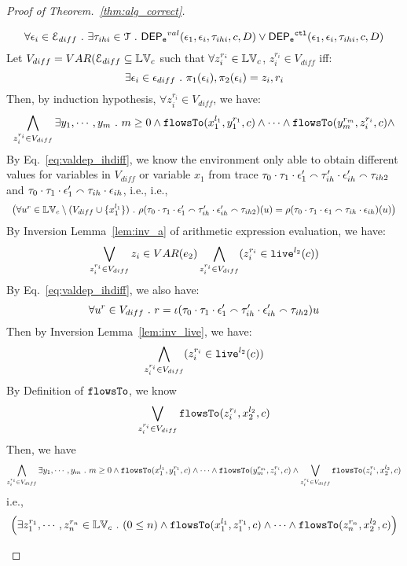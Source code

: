 \begin{proof}[Proof of Theorem.~\ref{thm:alg_correct}]
\begin{case}
\begin{subcase}
\[
  \forall \mathtt{\epsilon}_i \in \mathcal{E}_{diff} ~.~ \exists \mathtt{\tau}_{ihi} \in \mathcal{T} ~.~
  \mathsf{DEP_{\mathtt{e}}}^{val}(\mathtt{\epsilon}_1, \mathtt{\epsilon}_i, \mathtt{\tau}_{ihi}, c, D) 
  \lor \mathsf{DEP_{\mathtt{e}}}^{\mathtt{{ctl}}}(\mathtt{\epsilon}_1, \mathtt{\epsilon}_i, \mathtt{\tau}_{ihi}, c, D)
\]
Let $V_{diff} = VAR(\mathcal{E}_{diff} \subseteq \mathbb{LV}_c$ such that $\forall z_i^{r_i} \in \mathbb{LV}_c$, $z_i^{r_i} \in V_{diff}$ iff:
\[
  \exists \mathtt{\epsilon}_i \in \mathtt{\epsilon}_{diff} ~.~ \pi_1(\mathtt{\epsilon}_i), \pi_2(\mathtt{\epsilon}_i) = z_i, r_i
\]
Then, by induction hypothesis, $\forall z_i^{r_i} \in V_{diff}$, we have:
\[
  \bigwedge_{z_i^{r_i} \in V_{diff}}
  \exists y_1, \cdots, y_m ~.~ 
  m \geq 0 \land
  \mathtt{flowsTo}(x_1^{l_1}, y_1^{r_1}, c) \land \cdots \land \mathtt{flowsTo}(y_m^{r_m}, z_i^{r_i}, c) \land 
\]
%
%
By Eq.~\ref{eq:valdep_ihdiff}, we know 
the environment only able to obtain different values for variables in $V_{diff}$ or variable $x_1$
from trace $\mathtt{\tau}_0 \cdot \mathtt{\tau}_1 \cdot \mathtt{\epsilon}_1' \smallfrown \mathtt{\tau}_{ih}' \cdot \mathtt{\epsilon}_{ih}' \smallfrown \mathtt{\tau}_{ih2}$ 
and 
$\mathtt{\tau}_0 \cdot \mathtt{\tau}_1 \cdot \mathtt{\epsilon}_1' \smallfrown \mathtt{\tau}_{ih} \cdot \mathtt{\epsilon}_{ih}$, i.e.,
 i.e., 
\[
\begin{array}{l}
  \big(\forall u^r \in \mathbb{LV}_c \setminus (V_{diff} \cup \{x_1^{l_1}\}) ~.~
    \rho(\mathtt{\tau}_0 \cdot \mathtt{\tau}_1 \cdot \mathtt{\epsilon}_1' \smallfrown \mathtt{\tau}_{ih}' \cdot \mathtt{\epsilon}_{ih}' \smallfrown \mathtt{\tau}_{ih2}) (u) =  
    \rho(\mathtt{\tau}_0 \cdot \mathtt{\tau}_1 \cdot \mathtt{\epsilon}_1 \smallfrown \mathtt{\tau}_{ih} \cdot \mathtt{\epsilon}_{ih}) (u)
    \big)
  \end{array}
\]
%
%
By {Inversion Lemma~\ref{lem:inv_a}} of arithmetic expression evaluation, we have: 
%
\[
  \bigvee_{z_i^{r_i} \in V_{diff}} z_i \in VAR(e_2)
  \bigwedge_{z_i^{r_i} \in V_{diff}} (z_i^{r_i} \in \mathtt{live}^{l_2}(c))
\]
%
By Eq.~\ref{eq:valdep_ihdiff}, we also have:
\[
   \forall u^r \in V_{diff} ~.~ r = \iota(\mathtt{\tau}_0 \cdot \mathtt{\tau}_1 \cdot \mathtt{\epsilon}_1' \smallfrown \mathtt{\tau}_{ih}' \cdot \mathtt{\epsilon}_{ih}' \smallfrown \mathtt{\tau}_{ih2}) u
\]
%
Then by Inversion Lemma~\ref{lem:inv_live}, we have:
\[
  \bigwedge_{z_i^{r_i} \in V_{diff}} (z_i^{r_i} \in \mathtt{live}^{l_2}(c))
\]
%
By Definition of $\mathtt{flowsTo}$, we know
\[
   \bigvee_{z_i^{r_i} \in V_{diff}}  \mathtt{flowsTo}(z_i^{r_i}, x_2^{l_2}, c)
\]
%
%
%
Then, we have
\[
  \bigwedge_{z_i^{r_i} \in V_{diff}}
  \exists y_1, \cdots, y_m ~.~ 
  m \geq 0 \land
  \mathtt{flowsTo}(x_1^{l_1}, y_1^{r_1}, c) \land \cdots \land \mathtt{flowsTo}(y_m^{r_m}, z_i^{r_i}, c) \land 
   \bigvee_{z_i^{r_i} \in V_{diff}}  \mathtt{flowsTo}(z_i^{r_i}, x_2^{l_2}, c)
\]
i.e.,
\[
\Big(\exists z_1^{r_1}, \cdots, z_n^{r_n} \in \mathbb{LV}_{{c}} ~.~ (0 \leq n  )
 \land \mathtt{flowsTo}(x_1^{l_1}, z_1^{r_1}, c) \land \cdots \land \mathtt{flowsTo}(z_n^{r_n}, {x}_2^{l_2}, c) \Big)
\]
\end{subcase}
\end{case}
\end{proof}
